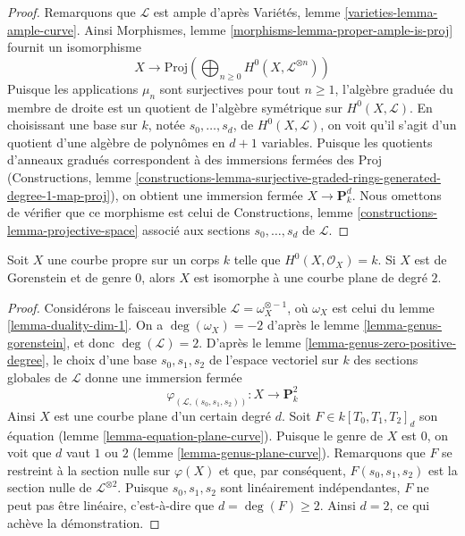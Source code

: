 \begin{proof}
\medskip\noindent
Remarquons que $\mathcal{L}$ est ample d'après Variétés, lemme \ref{varieties-lemma-ample-curve}. Ainsi Morphismes, lemme \ref{morphisms-lemma-proper-ample-is-proj} fournit un isomorphisme $$
X \longrightarrow
\text{Proj}\left(
\bigoplus\nolimits_{n \geq 0} H^0(X, \mathcal{L}^{\otimes n})\right)
$$ Puisque les applications $\mu_n$ sont surjectives pour tout $n \geq 1$, l'algèbre graduée du membre de droite est un quotient de l'algèbre symétrique sur $H^0(X, \mathcal{L})$. En choisissant une base sur $k$, notée $s_0, \ldots, s_d$, de $H^0(X, \mathcal{L})$, on voit qu'il s'agit d'un quotient d'une algèbre de polynômes en $d + 1$ variables. Puisque les quotients d'anneaux gradués correspondent à des immersions fermées des $\text{Proj}$ (Constructions, lemme \ref{constructions-lemma-surjective-graded-rings-generated-degree-1-map-proj}), on obtient une immersion fermée $X \to \mathbf{P}^d_k$. Nous omettons de vérifier que ce morphisme est celui de Constructions, lemme \ref{constructions-lemma-projective-space} associé aux sections $s_0, \ldots, s_d$ de $\mathcal{L}$.
\end{proof}

\begin{lemma}
\label{lemma-genus-zero}
Soit $X$ une courbe propre sur un corps $k$ telle que $H^0(X, \mathcal{O}_X) = k$. Si $X$ est de Gorenstein et de genre $0$, alors $X$ est isomorphe à une courbe plane de degré $2$.
\end{lemma}

\begin{proof}
Considérons le faisceau inversible $\mathcal{L} = \omega_X^{\otimes -1}$, où $\omega_X$ est celui du lemme \ref{lemma-duality-dim-1}. On a $\deg(\omega_X) = -2$ d'après le lemme \ref{lemma-genus-gorenstein}, et donc $\deg(\mathcal{L}) = 2$. D'après le lemme \ref{lemma-genus-zero-positive-degree}, le choix d'une base $s_0, s_1, s_2$ de l'espace vectoriel sur $k$ des sections globales de $\mathcal{L}$ donne une immersion fermée $$
\varphi_{(\mathcal{L}, (s_0, s_1, s_2))} :
X \longrightarrow \mathbf{P}^2_k
$$ Ainsi $X$ est une courbe plane d'un certain degré $d$. Soit $F \in k[T_0, T_1, T_2]_d$ son équation (lemme \ref{lemma-equation-plane-curve}). Puisque le genre de $X$ est $0$, on voit que $d$ vaut $1$ ou $2$ (lemme \ref{lemma-genus-plane-curve}). Remarquons que $F$ se restreint à la section nulle sur $\varphi(X)$ et que, par conséquent, $F(s_0, s_1, s_2)$ est la section nulle de $\mathcal{L}^{\otimes 2}$. Puisque $s_0, s_1, s_2$ sont linéairement indépendantes, $F$ ne peut pas être linéaire, c'est-à-dire que $d = \deg(F) \geq 2$. Ainsi $d = 2$, ce qui achève la démonstration.
\end{proof}

